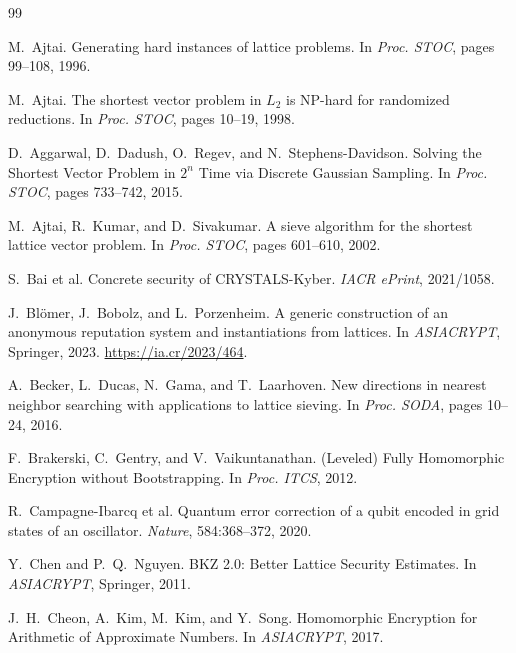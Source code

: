 ﻿\documentclass[a4paper,12pt]{article}
\theoremstyle{definition}
\begin{document}
\begin{thebibliography}{99}

M.~Ajtai.
\newblock Generating hard instances of lattice problems.
\newblock In \textit{Proc. STOC}, pages 99--108, 1996.

M.~Ajtai.
\newblock The shortest vector problem in $L_2$ is NP-hard for randomized reductions.
\newblock In \textit{Proc. STOC}, pages 10--19, 1998.

D.~Aggarwal, D.~Dadush, O.~Regev, and N.~Stephens-Davidson.
\newblock Solving the Shortest Vector Problem in $2^n$ Time via Discrete
  Gaussian Sampling.
\newblock In \textit{Proc. STOC}, pages 733--742, 2015.

M.~Ajtai, R.~Kumar, and D.~Sivakumar.
\newblock A sieve algorithm for the shortest lattice vector problem.
\newblock In \textit{Proc. STOC}, pages 601--610, 2002.

S.~Bai et al.
\newblock Concrete security of CRYSTALS-Kyber.
\newblock \textit{IACR ePrint}, 2021/1058.

J.~Blömer, J.~Bobolz, and L.~Porzenheim.
\newblock A generic construction of an anonymous reputation system and
  instantiations from lattices.
\newblock In \textit{ASIACRYPT}, Springer, 2023.
\newblock \url{https://ia.cr/2023/464}.

A.~Becker, L.~Ducas, N.~Gama, and T.~Laarhoven.
\newblock New directions in nearest neighbor searching with applications to
  lattice sieving.
\newblock In \textit{Proc. SODA}, pages 10--24, 2016.

F.~Brakerski, C.~Gentry, and V.~Vaikuntanathan.
\newblock (Leveled) Fully Homomorphic Encryption without Bootstrapping.
\newblock In \textit{Proc. ITCS}, 2012.

R.~Campagne-Ibarcq et al.
\newblock Quantum error correction of a qubit encoded in grid states of an
  oscillator.
\newblock \textit{Nature}, 584:368--372, 2020.

Y.~Chen and P.~Q.~Nguyen.
\newblock BKZ 2.0: Better Lattice Security Estimates.
\newblock In \textit{ASIACRYPT}, Springer, 2011.

J.~H.~Cheon, A.~Kim, M.~Kim, and Y.~Song.
\newblock Homomorphic Encryption for Arithmetic of Approximate Numbers.
\newblock In \textit{ASIACRYPT}, 2017.


\end{thebibliography}
\end{document}
